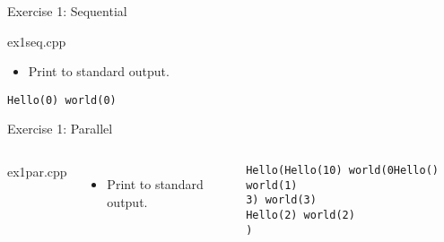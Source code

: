 \begin{frame}[t,fragile]{Exercise 1: Sequential}
\begin{block}{ex1seq.cpp}

\end{block}
\begin{itemize}
  \item Print to standard output.
\end{itemize}

\begin{lstlisting}[style=terminal]
Hello(0) world(0)
\end{lstlisting}
\end{frame}

\begin{frame}[t,fragile]{Exercise 1: Parallel}
\begin{columns}[T]

\begin{block}{ex1par.cpp}

\end{block}


\begin{itemize}
  \item Print to standard output.
\end{itemize}

\begin{lstlisting}[style=terminal]
Hello(Hello(10) world(0Hello() world(1)
3) world(3)
Hello(2) world(2)
)
\end{lstlisting}

\end{columns}
\end{frame}

